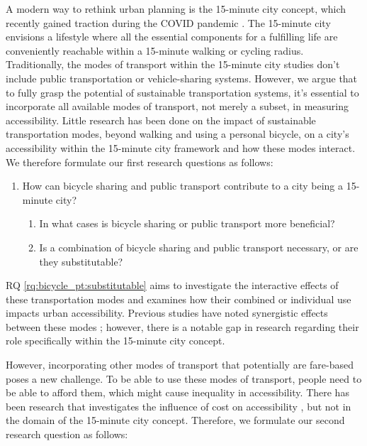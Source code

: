 A modern way to rethink urban planning is the 15-minute city concept, which recently gained traction during the COVID pandemic .
The 15-minute city envisions a lifestyle where all the essential components for a fulfilling life are conveniently reachable within a 15-minute walking or cycling radius.
Traditionally, the modes of transport within the 15-minute city studies don't include public transportation or vehicle-sharing systems.
However, we argue that to fully grasp the potential of sustainable transportation systems, it's essential to incorporate all available modes of transport, not merely a subset, in measuring accessibility.
Little research has been done on the impact of sustainable transportation modes, beyond walking and using a personal bicycle, on a city's accessibility within the 15-minute city framework and how these modes interact.
We therefore formulate our first research questions as follows:
\begin{enumerate}
  \renewcommand{\labelenumi}{RQ \theenumi.}
  \item How can bicycle sharing and public transport contribute to a city being a 15-minute city?
  \label{rq:bicycle_pt}
  \begin{enumerate}
    \item In what cases is bicycle sharing or public transport more beneficial?
    \label{rq:bicycle_pt:beneficial}
    \item Is a combination of bicycle sharing and public transport necessary, or are they substitutable?
    \label{rq:bicycle_pt:substitutable}
  \end{enumerate}
\end{enumerate}
RQ \ref{rq:bicycle_pt:substitutable} aims to investigate the interactive effects of these transportation modes and examines how their combined or individual use impacts urban accessibility. 
Previous studies have noted synergistic effects between these modes ; however, there is a notable gap in research regarding their role specifically within the 15-minute city concept.

However, incorporating other modes of transport that potentially are fare-based poses a new challenge.
To be able to use these modes of transport, people need to be able to afford them, which might cause inequality in accessibility.
There has been research that investigates the influence of cost on accessibility , but not in the domain of the 15-minute city concept.
Therefore, we formulate our second research question as follows:

